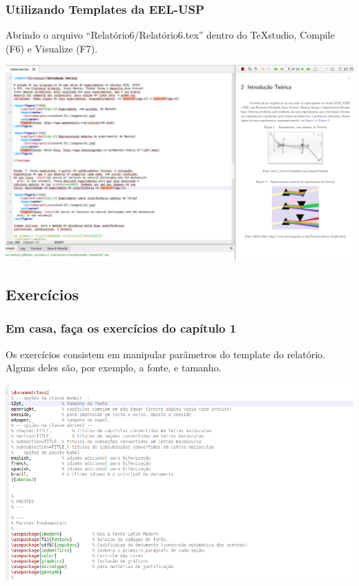 \documentclass{beamer}
\begin{document}
\begin{frame}

  \frametitle{Utilizando Templates da EEL-USP}

  Abrindo o arquivo ``Relatório6/Relatório6.tex'' dentro do TeXstudio,
  Compile (F6) e Visualize (F7).

  \begin{center}
    \includegraphics[scale=0.20] {../Imagens/ST3.png}
  \end{center}


\end{frame}





\begin{frame}

  \section{Exercícios}
  \frametitle{Em casa, faça os exercícios do capítulo 1}

  Os exercícios consistem em manipular parâmetros do template do
  relatório. Alguns deles são, por exemplo, a fonte, e tamanho.

  \begin{center}
    \includegraphics[scale=0.30] {../Imagens/ST4.png}
  \end{center}

\end{frame}
\end{document}
